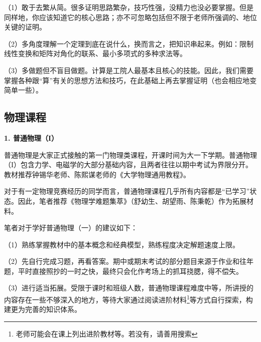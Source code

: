 \documentclass[11pt,oneside]{book}
\begin{document}
\vspace{10pt}

（1）敢于去繁从简。很多证明思路繁杂，技巧性强，没精力也没必要掌握。但是同样地，你应该知道它的核心思路；亦不可忽略包括但不限于老师所强调的、地位关键的证明。

\vspace{10pt}

（2）多角度理解一个定理到底在说什么，换而言之，把知识串起来。例如：限制线性变换和矩阵对角化的联系、最小多项式的多种求法等。

\vspace{10pt}

（3）多做题但不盲目做题。计算是工院人最基本且核心的技能。因此，我们需要掌握各种跟“算”有关的思想方法和技巧，在此基础上再去掌握证明（也会相应地变简单一些）。

\vspace{10pt}

\subsection{物理课程}
\textbf{1. 普通物理（I）}

普通物理是大家正式接触的第一门物理类课程，开课时间为大一下学期。普通物理（I）包含力学、电磁学的大部分基础内容，且两者往往以期中考试为界限分开。教材推荐钟锡华老师、陈熙谋老师的《大学物理通用教程》。

\vspace{10pt}

对于有一定物理竞赛经历的同学而言，普通物理课程几乎所有内容都是“已学习”状态。因此，笔者推荐《物理学难题集萃》（舒幼生、胡望雨、陈秉乾）作为拓展材料。

\vspace{10pt}

笔者对于学好普通物理（一）的建议如下：

\vspace{10pt}

（1）熟练掌握教材中的基本概念和经典模型，熟练程度决定解题速度上限。

\vspace{10pt}

（2）先自行完成习题，再看答案。期中或期末考试的部分题目来源于作业和往年题，平时直接照抄的一时之快，最终只会化作考场上的抓耳挠腮，得不偿失。

\vspace{10pt}

（3）进行适当拓展。受限于课时和班级人数，普通物理课程难度中等，所讲授的内容存在一些不够深入的地方，等待大家通过阅读进阶材料\footnote{老师可能会在课上列出进阶教材等。若没有，请善用搜索}等方式自行探索，构建更为完善的知识体系。
\end{document}
